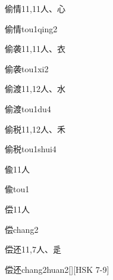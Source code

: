 \begin{Entry}{偷情}{11,11}{⼈、⼼}
  \begin{Phonetics}{偷情}{tou1qing2}
  \end{Phonetics}
\end{Entry}

\begin{Entry}{偷袭}{11,11}{⼈、⾐}
  \begin{Phonetics}{偷袭}{tou1xi2}
  \end{Phonetics}
\end{Entry}

\begin{Entry}{偷渡}{11,12}{⼈、⽔}
  \begin{Phonetics}{偷渡}{tou1du4}
  \end{Phonetics}
\end{Entry}

\begin{Entry}{偷税}{11,12}{⼈、⽲}
  \begin{Phonetics}{偷税}{tou1shui4}
  \end{Phonetics}
\end{Entry}

\begin{Entry}{偸}{11}{⼈}
  \begin{Phonetics}{偸}{tou1}
  \end{Phonetics}
\end{Entry}

\begin{Entry}{偿}{11}{⼈}
  \begin{Phonetics}{偿}{chang2}
  \end{Phonetics}
\end{Entry}

\begin{Entry}{偿还}{11,7}{⼈、⾡}
  \begin{Phonetics}{偿还}{chang2huan2}[][HSK 7-9]
  \end{Phonetics}
\end{Entry}


